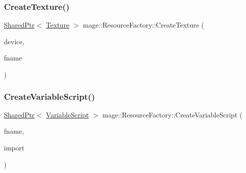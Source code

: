 \hypertarget{classmage_1_1_resource_factory_ab7f2069f6baf97fb158bf45a76e0a657}{}\label{classmage_1_1_resource_factory_ab7f2069f6baf97fb158bf45a76e0a657} 
\subsubsection{\texorpdfstring{Create\+Texture()}{CreateTexture()}}
{\footnotesize\ttfamily \hyperlink{namespacemage_a1e01ae66713838a7a67d30e44c67703e}{Shared\+Ptr}$<$ \hyperlink{classmage_1_1_texture}{Texture} $>$ mage\+::\+Resource\+Factory\+::\+Create\+Texture (\begin{DoxyParamCaption}\item[{I\+D3\+D11\+Device2 $\ast$}]{device,  }\item[{const wstring \&}]{fname }\end{DoxyParamCaption})}

\hypertarget{classmage_1_1_resource_factory_a523e3f76a3d8347f6d75a7b87a291b1e}{}\label{classmage_1_1_resource_factory_a523e3f76a3d8347f6d75a7b87a291b1e} 
\subsubsection{\texorpdfstring{Create\+Variable\+Script()}{CreateVariableScript()}}
{\footnotesize\ttfamily \hyperlink{namespacemage_a1e01ae66713838a7a67d30e44c67703e}{Shared\+Ptr}$<$ \hyperlink{classmage_1_1_variable_script}{Variable\+Script} $>$ mage\+::\+Resource\+Factory\+::\+Create\+Variable\+Script (\begin{DoxyParamCaption}\item[{const wstring \&}]{fname,  }\item[{bool}]{import }\end{DoxyParamCaption})}

\hypertarget{classmage_1_1_resource_factory_a1a99724dd744fde5ce2a1488966b30d0}{}\label{classmage_1_1_resource_factory_a1a99724dd744fde5ce2a1488966b30d0} 
